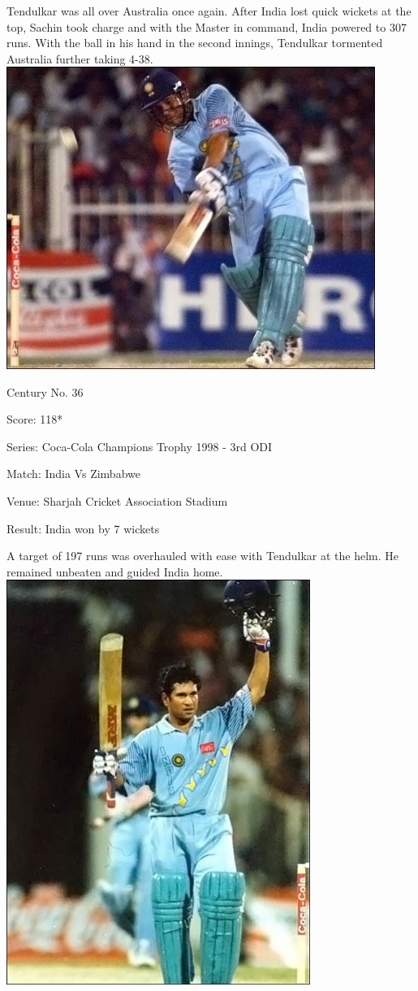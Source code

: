 \documentclass[11pt, a4paper]{article}
\begin{document}
Tendulkar was all over Australia once again. After India lost quick wickets at the top, Sachin took charge and with the Master in command, India powered to 307 runs. With the ball in his hand in the second innings, Tendulkar tormented Australia further taking 4-38.
\newpage
\includegraphics[width=0.9\textwidth]{pics/36.jpg}

Century No. 36

Score: 118*

Series: Coca-Cola Champions Trophy 1998 - 3rd ODI

Match: India Vs Zimbabwe

Venue: Sharjah Cricket Association Stadium

Result: India won by 7 wickets

A target of 197 runs was overhauled with ease with Tendulkar at the helm. He remained unbeaten and guided India home.
\newpage
\includegraphics[height=0.75\textheight]{pics/37.jpg}
\end{document}
